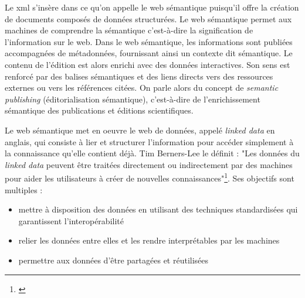 \documentclass[a4paper, 12pt, twoside]{book}
\begin{document}
Le \gls{xml} s'insère dans ce qu'on appelle le web sémantique puisqu'il offre la création de documents composés de données structurées. Le web sémantique permet aux machines de comprendre la sémantique c'est-à-dire la signification de l'information sur le web. Dans le web sémantique, les informations sont publiées accompagnées de métadonnées, fournissant ainsi un contexte dit sémantique. Le contenu de l'édition est alors enrichi avec des données interactives. Son sens est renforcé par des balises sémantiques et des liens directs vers des ressources externes ou vers les références citées. On parle alors du concept de \textit{semantic publishing} (éditorialisation sémantique), c'est-à-dire de l'enrichissement sémantique des publications et éditions scientifiques. 

Le web sémantique met en oeuvre le web de données, appelé \textit{linked data} en anglais, qui consiste à lier et structurer l'information pour accéder simplement à la connaissance qu'elle contient déjà. Tim Berners-Lee le définit : "Les données du \textit{linked data} peuvent être traitées directement ou indirectement par des machines pour aider les utilisateurs à créer de nouvelles connaissances"\footnote{\cite{berners-lee_semantic_2001}}. Ses objectifs sont multiples :
\begin{itemize}
    \item mettre à disposition des données en utilisant des techniques standardisées qui garantissent l'interopérabilité
     \item relier les données entre elles et les rendre interprétables par les machines
     \item permettre aux données d'être partagées et réutilisées
\end{itemize}
\end{document}
